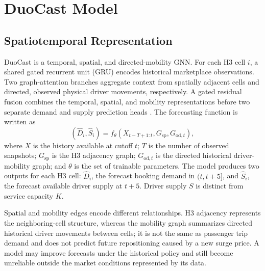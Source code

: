 \documentclass[a4paper,10pt,twocolumn]{article}
\begin{document}
\section{DuoCast Model}
\subsection{Spatiotemporal Representation}
DuoCast is a temporal, spatial, and directed-mobility GNN. For each H3 cell
$i$, a shared gated recurrent unit (GRU) encodes historical marketplace
observations. Two graph-attention branches aggregate context from spatially
adjacent cells and directed, observed physical driver movements, respectively.
A gated residual fusion combines the temporal, spatial, and mobility
representations before two separate demand and supply prediction heads
\cite{cho2014,brody2022,geng2019}.
The forecasting function is written as
\begin{equation}
 (\widehat D_i,\widehat S_i)=
 f_{\theta}(X_{t-T+1:t},G_{\mathrm{sp}},G_{\mathrm{od},t}),
 \label{eq:forecast}
\end{equation}
where $X$ is the history available at cutoff $t$; $T$ is the number of
observed snapshots; $G_{\mathrm{sp}}$ is the H3 adjacency graph;
$G_{\mathrm{od},t}$ is the directed historical driver-mobility graph;
and $\theta$ is the set of trainable parameters. The model produces two outputs
for each H3 cell: $\widehat D_i$, the forecast booking demand in $(t,t+5]$, and
$\widehat S_i$, the forecast available driver supply at $t+5$. Driver supply
$S$ is distinct from service capacity $K$.

Spatial and mobility edges encode different relationships. H3 adjacency
represents the neighboring-cell structure, whereas the mobility graph summarizes
directed historical driver movements between cells; it is not the same
as passenger trip demand and does not predict future repositioning caused
by a new surge price. A model may improve forecasts under the historical
policy and still become unreliable outside the market conditions represented
by its data.
\end{document}
